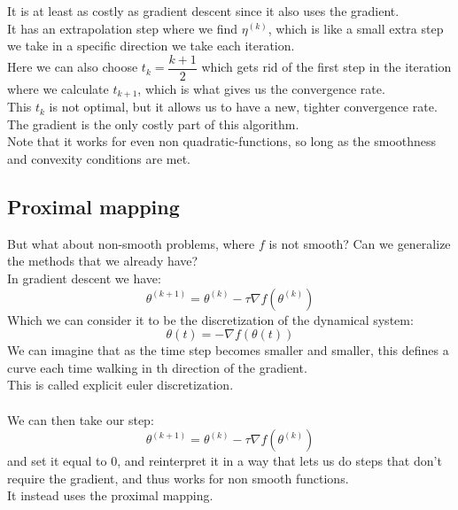 \documentclass[12pt]{article}
\begin{document}
It is at least as costly as gradient descent
since it also uses the gradient. \\

It has an extrapolation step where
we find $\eta^{(k)}$, which is like
a small extra step
we take in a specific direction
we take each iteration. \\

Here we can also choose $t_k = \dfrac{k + 1}{2}$
which gets rid of
the first step in the iteration where we calculate
$t_{k+1}$, which is what gives
us the convergence rate. \\

This $t_k$ is not optimal, but it allows
us to have a new, tighter convergence rate. \\

The gradient is the only costly part of this
algorithm. \\

Note that it works for even non quadratic-functions,
so long as the smoothness and convexity
conditions are met. \\

\newpage

\subsection*{Proximal mapping}

But what about non-smooth problems,
where $f$ is not smooth?
Can we generalize the methods that
we already have? \\

In gradient descent we have:
\[ \theta^{(k+1)} = 
\theta^{(k)} - \tau\nabla f(\theta^{(k)}) \]
Which we can consider it to be the
discretization of the dynamical system:
\[ \theta(t) = -\nabla f(\theta(t)) \]
We can imagine that as the time step
becomes smaller and smaller, this defines
a curve each time walking in th direction
of the gradient. \\

This is called explicit euler discretization. \\

 \\

We can then take our step:
\[ \theta^{(k+1)} = 
\theta^{(k)} - \tau\nabla f(\theta^{(k)}) \]
and set it equal to $0$,
and reinterpret it in a way that lets
us do steps that don't require the gradient,
and thus works for non smooth functions. \\
It instead uses the proximal mapping. \\
\end{document}
